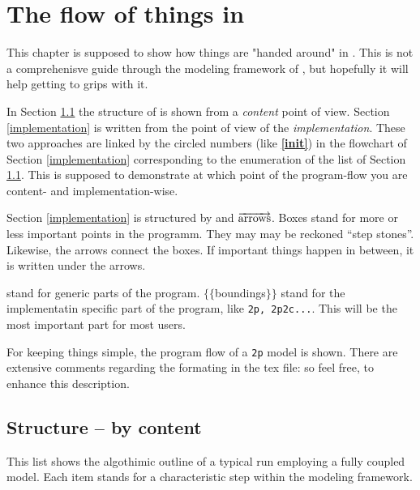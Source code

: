
\newcommand{\nextline}{\par\phantom{a}\vspace*{0.1\textwidth}}
\chapter{The flow of things in \Dumux}

This chapter is supposed to show how things are "handed around" in \Dumux. This is not a comprehenisve guide through the modeling framework of \Dumux, but hopefully it will help getting to grips with it. 

In Section \ref{content} the structure of \Dumux is shown from a \emph{content} point of view.
Section \ref{implementation} is written from the point of view of the \emph{implementation}. These two approaches are linked by the circled numbers (like \textbf{\textcircled{\ref{init}}}) in the flowchart of Section \ref{implementation} corresponding to the enumeration of the list of Section \ref{content}. This is supposed to demonstrate at which point of the program-flow you are content- and implementation-wise. 

Section \ref{implementation} is structured by  and $\overrightarrow{\textnormal{arrows}}$. Boxes stand for more or less important points in the programm. They may may be reckoned ``step stones''. Likewise, the arrows connect the boxes. If important things happen in between, it is written under the arrows.

 stand for generic parts of the program.  $\lbrace\lbrace$boundings$\rbrace\rbrace$ stand for the implementatin specific part of the program, like \verb+2p, 2p2c...+. This will be the most important part for most users. 

For keeping things simple, the program flow of a \verb+2p+ model is shown.
There are extensive comments regarding the formating in the tex file: so feel free, to enhance this description.

\section{Structure -- by content}
\label{content}
This list shows the algothimic outline of a typical \Dumux run employing a fully coupled model. Each item stands for a characteristic step within the modeling framework. 

